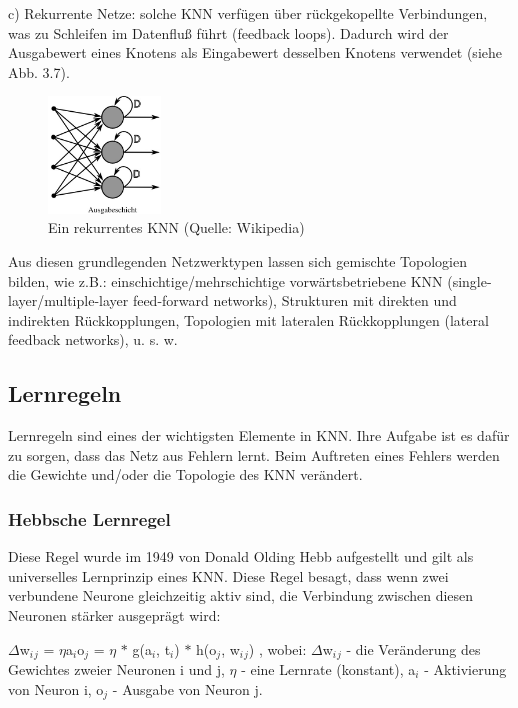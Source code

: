 c) Rekurrente Netze: solche KNN verfügen über rückgekopellte Verbindungen, was zu Schleifen im Datenfluß führt (feedback loops). Dadurch wird der Ausgabewert eines Knotens als Eingabewert desselben Knotens verwendet (siehe Abb. 3.7).

\begin{figure}[h]
\centering
\includegraphics[width=3cm]{chapters/neural_networks/Recurrent.jpg}

\caption{Ein rekurrentes KNN (Quelle: Wikipedia)}
	\label{img:recurrent}

\end{figure}

Aus diesen grundlegenden Netzwerktypen lassen sich gemischte Topologien bilden, wie z.B.: einschichtige/mehrschichtige vorwärtsbetriebene KNN (single-layer/multiple-layer feed-forward networks), Strukturen mit direkten und indirekten Rückkopplungen, Topologien mit lateralen Rückkopplungen (lateral feedback networks), u. s. w.

\subsection{Lernregeln}

Lernregeln sind eines der wichtigsten Elemente in KNN. Ihre Aufgabe ist es dafür zu sorgen, dass das Netz aus Fehlern lernt. Beim Auftreten eines Fehlers werden die Gewichte und/oder die Topologie des KNN verändert.

\subsubsection{Hebbsche Lernregel}

Diese Regel wurde im 1949 von Donald Olding Hebb aufgestellt und gilt als universelles Lernprinzip eines KNN. Diese Regel besagt, dass wenn zwei verbundene Neurone gleichzeitig aktiv sind, die Verbindung zwischen diesen Neuronen stärker ausgeprägt wird:

$\Delta$w$_i$$_j$ = $\eta$a$_i$o$_j$ = $\eta$ $*$ g(a$_i$, t$_i$) $*$ h(o$_j$, w$_i$$_j$) ,
\newline
 wobei:  $\Delta$w$_i$$_j$ - die Veränderung des Gewichtes zweier Neuronen i und j,  $\eta$ - eine Lernrate (konstant), a$_i$ - Aktivierung von Neuron i, o$_j$ - Ausgabe von Neuron j.

